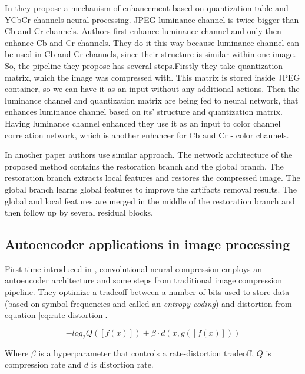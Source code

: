 In \cite{ehrlich_quantization_2020} they propose a mechanism of enhancement based on quantization table and YCbCr channels neural processing. JPEG \cite{JPEG-1992} luminance channel is twice bigger than Cb and Cr channels. Authors first enhance luminance channel and only then enhance Cb and Cr channels. They do it this way because luminance channel can be used in Cb and Cr channels, since their structure is similar within one image. So, the pipeline they propose has several steps.Firstly they take quantization matrix, which the image was compressed with. This matrix is stored inside JPEG container, so we can have it as an input without any additional actions. Then the luminance channel and quantization matrix are being fed to neural network, that enhances luminance channel based on its' structure and quantization matrix. Having luminance channel enhanced they use it as an input to color channel correlation network, which is another enhancer for Cb and Cr - color channels.

In another paper \cite{li_learning_2020} authors use similar approach. The network architecture of the proposed method contains the restoration branch and the global branch. The restoration branch extracts local features and restores the compressed image. The global branch learns global features to improve the artifacts removal results. The global and local features are merged in the middle of the restoration branch and then follow up by several residual blocks.

\subsection{Autoencoder applications in image processing}

First time introduced in \cite{Toderici_Vincent_Johnston_Hwang_Minnen_Shor_Covell_2017}, convolutional neural compression employs an autoencoder architecture and some steps from traditional image compression pipeline. They optimize a tradeoff between a number of bits used to store data (based on symbol frequencies and called an \textit{entropy coding}) and distortion from equation \ref{eq:rate-distortion}.

\begin{equation}
    \label{eq:rate-distortion}
    − log_2 Q ([f (x)]) + \beta · d (x, g([f (x)]))
\end{equation}

Where $\beta$ is a hyperparameter that controls a rate-distortion tradeoff, $Q$ is compression rate and $d$ is distortion rate.

